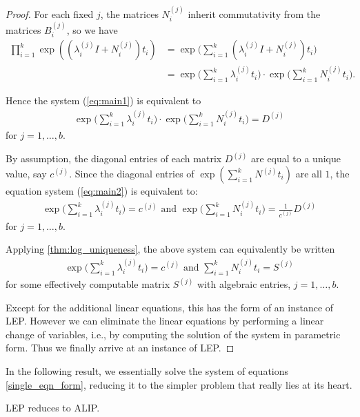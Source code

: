 \begin{proof}
For each fixed $j$, the matrices $N_{i}^{(j)}$ inherit commutativity from
the matrices $B^{(j)}_{i}$, so we have
\begin{align*}
\prod\limits_{i=1}^{k} \exp((\lambda_i^{(j)}I + N_i^{(j)})t_{i}) &=
   \exp\big(\sum_{i=1}^k (\lambda_i^{(j)}I  +
 N_i^{(j)}) t_i \big)\\
&= \exp\big(\sum_{i=1}^k \lambda_i^{(j)} t_i\big) \cdot
   \exp\big(\sum_{i=1}^k N_i^{(j)} t_i \big) .
\end{align*}

Hence the system (\ref{eq:main1}) is equivalent to
\begin{align}
\exp\big(\sum_{i=1}^k \lambda_i^{(j)} t_i\big) \cdot
   \exp\big(\sum_{i=1}^k N_i^{(j)} t_i \big)  = D^{(j)}
\label{eq:main2}
\end{align}
for $j=1,\ldots,b$.

By assumption, the diagonal entries of each matrix $D^{(j)}$ are
equal to a unique value, say $c^{(j)}$.
Since the diagonal entries of
$\exp\left(\sum_{i=1}^kN^{(j)}t_i\right)$
are all $1$, the equation system (\ref{eq:main2}) is equivalent to:
\begin{align*}
\exp\big(\sum_{i=1}^k \lambda_i^{(j)} t_i\big)
= c^{(j)} \mbox{ and }\exp\big(\sum_{i=1}^k N_i^{(j)} t_i \big)
=\frac{1}{c^{(j)}} D^{(j)}
\end{align*}
for $j=1,\ldots,b$.

Applying \cref{thm:log_uniqueness}, the
above system can equivalently be written
\begin{align*}
\exp\big(\sum_{i=1}^k \lambda_i^{(j)} t_i\big)
= c^{(j)} \mbox{ and } \sum_{i=1}^k
N_i^{(j)} t_i =
S^{(j)}
\end{align*}
for  some effectively computable matrix
$S^{(j)}$ with algebraic entries, $j=1,\ldots,b$.

Except for the additional linear equations, this has the form of an
instance of LEP.
 However we can eliminate the linear equations by
performing a linear change of variables, i.e., by computing the
solution of the system in parametric form.  Thus we finally arrive at
an instance of LEP.
\end{proof}


In the following result, we essentially solve the system of equations \ref{single_eqn_form}, reducing it to the simpler problem that really lies at its heart.

\begin{theorem}
\label{reference-for-log}
LEP reduces to ALIP.
\end{theorem}

